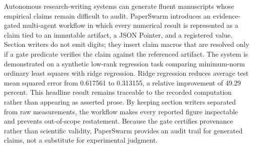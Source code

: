 Autonomous research-writing systems can generate fluent manuscripts whose empirical claims remain difficult to audit. PaperSwarm introduces an evidence-gated multi-agent workflow in which every numerical result is represented as a claim tied to an immutable artifact, a JSON Pointer, and a registered value. Section writers do not emit digits; they insert claim macros that are resolved only if a gate predicate verifies the claim against the referenced artifact. The system is demonstrated on a synthetic low-rank regression task comparing minimum-norm ordinary least squares with ridge regression. Ridge regression reduces average test mean squared error from 0.617561 to 0.313155, a relative improvement of 49.29 percent. This headline result remains traceable to the recorded computation rather than appearing as asserted prose. By keeping section writers separated from raw measurements, the workflow makes every reported figure inspectable and prevents out-of-scope restatement. Because the gate certifies provenance rather than scientific validity, PaperSwarm provides an audit trail for generated claims, not a substitute for experimental judgment.
